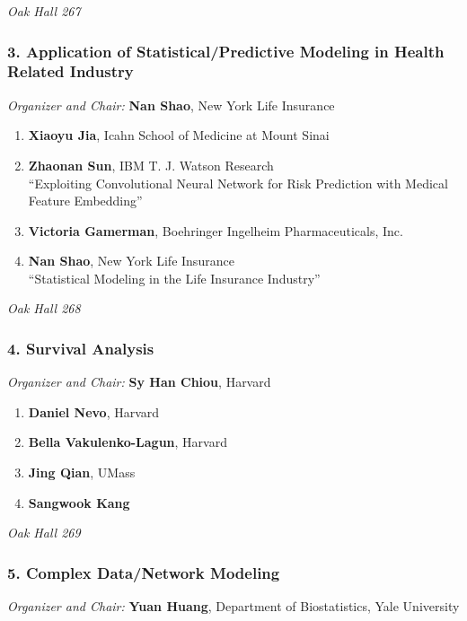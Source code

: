\emph{Oak Hall 267} \\[.5em]

\subsubsection*{3. Application of Statistical/Predictive Modeling in Health Related Industry}

\emph{Organizer and Chair:} \textbf{Nan Shao}, New York Life Insurance

\begin{enumerate}
\item \textbf{Xiaoyu Jia}, Icahn School of Medicine at Mount Sinai 
\item \textbf{Zhaonan Sun}, IBM T. J. Watson Research \\
``Exploiting Convolutional Neural Network for Risk Prediction with Medical Feature Embedding''
\item \textbf{Victoria Gamerman}, Boehringer Ingelheim Pharmaceuticals, Inc. 
\item \textbf{Nan Shao}, New York Life Insurance \\
``Statistical Modeling in the Life Insurance Industry''
\end{enumerate}

\emph{Oak Hall 268} \\[.5em]

\subsubsection*{4. Survival Analysis}

\emph{Organizer and Chair:} \textbf{Sy Han Chiou}, Harvard

\begin{enumerate}
\item \textbf{Daniel Nevo}, Harvard 
\item \textbf{Bella Vakulenko-Lagun}, Harvard 
\item \textbf{Jing Qian}, UMass 
\item \textbf{Sangwook Kang} 
\end{enumerate}

\emph{Oak Hall 269} \\[.5em]

\subsubsection*{5. Complex Data/Network Modeling}

\emph{Organizer and Chair:} \textbf{Yuan Huang}, Department of Biostatistics, Yale University

